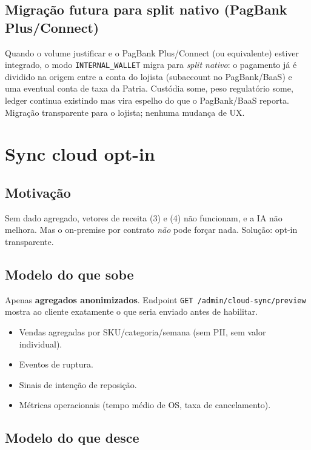 \documentclass[11pt,a4paper]{article}
\begin{document}
\subsection{Migração futura para split nativo (PagBank Plus/Connect)}

Quando o volume justificar e o PagBank Plus/Connect (ou equivalente)
estiver integrado, o modo \texttt{INTERNAL\_WALLET} migra para
\emph{split nativo}: o pagamento já é dividido na origem entre a conta
do lojista (subaccount no PagBank/BaaS) e uma eventual conta de taxa da
Patria. Custódia some, peso regulatório some, ledger continua existindo
mas vira espelho do que o PagBank/BaaS reporta. Migração transparente
para o lojista; nenhuma mudança de UX.

\section{Sync cloud opt-in}

\subsection{Motivação}

Sem dado agregado, vetores de receita (3) e (4) não funcionam, e a IA
não melhora. Mas o on-premise por contrato \emph{não} pode forçar
nada. Solução: opt-in transparente.

\subsection{Modelo do que sobe}

Apenas \textbf{agregados anonimizados}. Endpoint
\texttt{GET /admin/cloud-sync/preview} mostra ao cliente exatamente o que
seria enviado antes de habilitar.

\begin{itemize}[leftmargin=2em]
  \item Vendas agregadas por SKU/categoria/semana (sem PII, sem valor
        individual).
  \item Eventos de ruptura.
  \item Sinais de intenção de reposição.
  \item Métricas operacionais (tempo médio de OS, taxa de cancelamento).
\end{itemize}

\subsection{Modelo do que desce}
\end{document}
